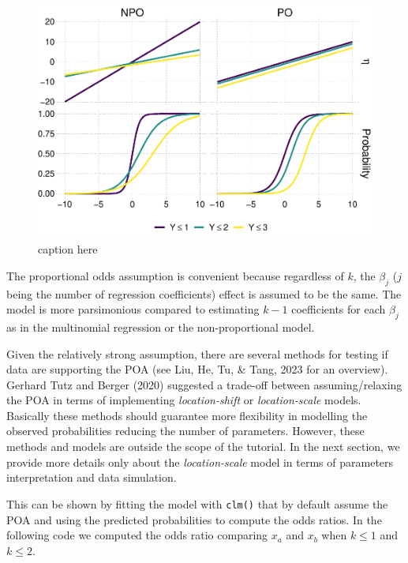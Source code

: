 \documentclass[
  man,floatsintext]{apa6}
\begin{document}
\begin{figure}

{\centering \includegraphics{paper-new_files/figure-latex/fig-prop-odds-1} 

}

\caption{caption here}\label{fig:fig-prop-odds}
\end{figure}

\normalsize

The proportional odds assumption is convenient because regardless of \(k\), the \(\beta_j\) (\(j\) being the number of regression coefficients) effect is assumed to be the same. The model is more parsimonious compared to estimating \(k - 1\) coefficients for each \(\beta_j\) as in the multinomial regression or the non-proportional model.

Given the relatively strong assumption, there are several methods for testing if data are supporting the POA (see Liu, He, Tu, \& Tang, 2023 for an overview). Gerhard Tutz and Berger (2020) suggested a trade-off between assuming/relaxing the POA in terms of implementing \emph{location-shift} or \emph{location-scale} models. Basically these methods should guarantee more flexibility in modelling the observed probabilities reducing the number of parameters. However, these methods and models are outside the scope of the tutorial. In the next section, we provide more details only about the \emph{location-scale} model in terms of parameters interpretation and data simulation.

This can be shown by fitting the model with \texttt{clm()} that by default assume the POA and using the predicted probabilities to compute the odds ratios. In the following code we computed the odds ratio comparing \(x_a\) and \(x_b\) when \(k \leq 1\) and \(k \leq 2\).
\end{document}
